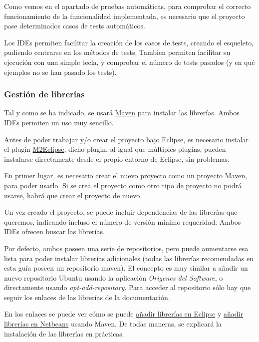 \documentclass[11pt]{article}
\begin{document}
Como vemos en el apartado de pruebas automáticas, para comprobar el correcto funcionamiento de la funcionalidad 
implementada, es necesario que el proyecto pase determinados casos de tests automáticos. 


Los IDEs permiten facilitar la creación de los casos de tests, creando el esqueleto, pudiendo centrarse en 
los métodos de tests. Tambien permiten facilitar su ejecución con una simple tecla, y comprobar el número de tests
pasados (y en qué ejemplos no se han pasado los tests).
\subsubsection{Gestión de librerías}
\label{sec-3-2-5}




Tal y como se ha indicado, se usará \hyperref[sec-5]{Maven} para instalar las librerías. Ambos IDEs permiten un uso muy sencillo. 


Antes de poder trabajar y/o crear el proyecto bajo Eclipse, es necesario instalar el plugin \href{http://m2eclipse.sonatype.org/}{M2Eclipse}, dicho
plugin, al igual que múltiples plugins, pueden instalarse directamente desde el propio entorno de Eclipse, 
sin problemas.


En primer lugar, es necesario crear el nuevo proyecto como un proyecto Maven, para poder usarlo. Si se crea el
proyecto como otro tipo de proyecto no podrá usarse, habrá que crear el proyecto de nuevo. 


Un vez creado el proyecto, se puede incluir dependencias de las librerías que queremos, indicando incluso el
número de versión mínimo requeridad. Ambos IDEs ofrecen buscar las librerías. 


Por defecto, ambos poseen una serie de repositorios, pero puede aumentarse esa lista para poder instalar
librerías adicionales (todas las librerías recomendadas en esta guía poseen un repositorio maven). El concepto
es muy similar a añadir un nuevo repositorio Ubuntu usando la aplicación \emph{Origenes del Software}, o directamente
usando \emph{apt-add-repository}. Para acceder al repositorio sólo hay que seguir los enlaces de las librerías
de la documentación.


En los enlaces se puede ver cómo se puede \href{http://m2eclipse.sonatype.org/adding-project-dependencies-in-m2eclipse.html}{añadir librerías en Eclipse} y \href{http://wiki.netbeans.org/MavenBestPractices}{añadir librerías en Netbeans}
usando Maven. 
De todas maneras, se explicará la instalación de las librerías en prácticas.
\end{document}
